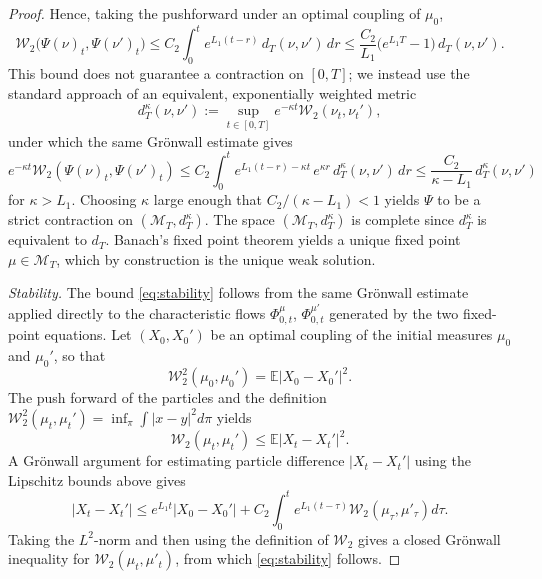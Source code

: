 \documentclass[11pt,a4wide]{article}
\theoremstyle{definition}
\newcommand{\Wass}{\mathcal{W}}
\begin{document}
\begin{proof}
Hence, taking the pushforward under an optimal coupling of $\mu_0$,
\begin{equation}
\Wass_2\big(\Psi(\nu)_t,\Psi(\nu')_t\big) \le C_2 \int_0^t e^{L_1(t-r)} \,d_T(\nu,\nu')\,dr \le \frac{C_2}{L_1}\big(e^{L_1T}-1\big)\,d_T(\nu,\nu').
\end{equation}
This bound does not guarantee  a contraction on $[0,T]$; we instead use the standard approach of an equivalent, exponentially weighted metric 
$$
d_T^\kappa(\nu,\nu') := \sup_{t\in[0,T]} e^{-\kappa t}\Wass_2(\nu_t,\nu_t'),
$$ 
under which the same Gr\"onwall estimate gives
\[
e^{-\kappa t}\Wass_2(\Psi(\nu)_t,\Psi(\nu')_t) \le C_2\int_0^t e^{L_1(t-r)-\kappa t}\,e^{\kappa r}\,d_T^\kappa(\nu,\nu')\,dr \le \frac{C_2}{\kappa-L_1}\,d_T^\kappa(\nu,\nu')
\]
for $\kappa>L_1$. Choosing $\kappa$ large enough that $C_2/(\kappa-L_1)<1$ yields $\Psi$ to be a strict contraction on $(\mathcal M_T,d_T^\kappa)$. The space $(\mathcal M_T,d_T^\kappa)$  is complete since $d_T^\kappa$ is equivalent to $d_T$. Banach's fixed point theorem yields a unique fixed point $\mu\in\mathcal M_T$, which by construction is the unique weak solution.

\emph{Stability.} The bound \eqref{eq:stability} follows from the same Gr\"onwall estimate applied directly to the  characteristic flows $\Phi^\mu_{0,t}$, $\Phi^{\mu'}_{0,t}$ generated by the two fixed-point equations. Let $(X_0, X_0')$ 
be an optimal coupling of the initial measures $\mu_0$ and $\mu_0'$, so that
$$
\Wass_2^2(\mu_0,\mu_0') = \mathbb E|X_0-X_0'|^2.
$$
The push forward of the particles and the definition  $\Wass_2^2(\mu_t,\mu_t')=\inf_\pi \int|x-y|^2d\pi$ yields
\[
\Wass_2(\mu_t,\mu_t')\le \mathbb E|X_t-X_t'|^2. 
\]
A Gr\"onwall argument for estimating particle difference $|X_t-X_t'|$ using the Lipschitz bounds above gives 
$$
|X_t-X_t'|\leq e^{L_1 t}|X_0-X_0'| + C_2\int_0^t e^{L_1(t-\tau)} \Wass_2(\mu_\tau,\mu'_\tau)d\tau.
$$
Taking the $L^2$-norm and then using the definition of $\Wass_2$ gives a closed Grönwall inequality for $\Wass_2(\mu_t, \mu'_t)$, from which  \eqref{eq:stability} follows.
\end{proof}
\end{document}

